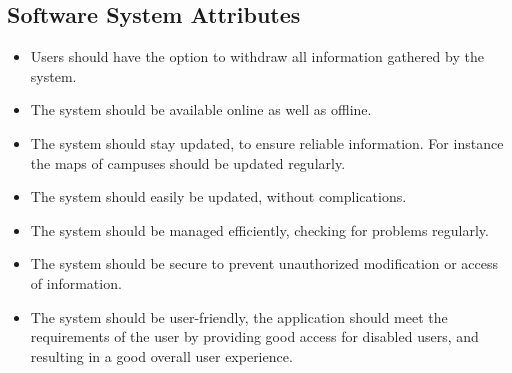 \documentclass[12pt]{article}
\begin{document}
	\subsection{Software System Attributes}
	\begin{itemize}
		\item Users should have the option to withdraw all information gathered by the system.
		\item The system should be available online as well as offline.
		\item The system should stay updated, to ensure reliable information. For instance the maps of campuses should be updated regularly.
		\item The system should easily be updated, without complications.
		\item The system should be managed efficiently, checking for problems regularly.
		\item The system should be secure to prevent unauthorized modification or access of information.
		\item The system should be user-friendly, the application should meet the requirements of the user by providing good access for disabled users, and resulting in a good overall user experience.
		\end{itemize}
\end{document}
